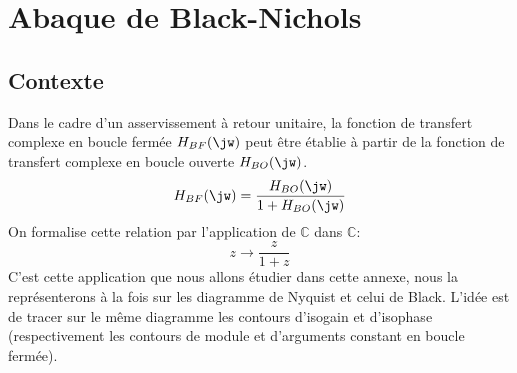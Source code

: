 \chapter{Abaque de Black-Nichols~\label{annexe-blackNichols}}
\section{Contexte}

Dans le cadre d'un asservissement à retour unitaire, la fonction de transfert 
complexe en boucle fermée $H_{BF}(\jw)$ peut être établie à partir de la 
fonction de transfert complexe en boucle ouverte $H_{BO}(\jw)$.
\[
    H_{BF}(\jw)=\dfrac{H_{BO}(\jw)}{1+H_{BO}(\jw)}
\]
On formalise cette relation par l'application de $\mathbb{C}$ dans $\mathbb{C}$:
\begin{equation*}
    z\to\dfrac{z}{1+z}
\end{equation*}
C'est cette application que nous allons étudier dans cette annexe, nous la 
représenterons à la fois sur les diagramme de Nyquist et celui de Black.
L'idée est de tracer sur le même diagramme les contours d'isogain et d'isophase 
(respectivement les contours de module et d'arguments constant 
en boucle fermée).
